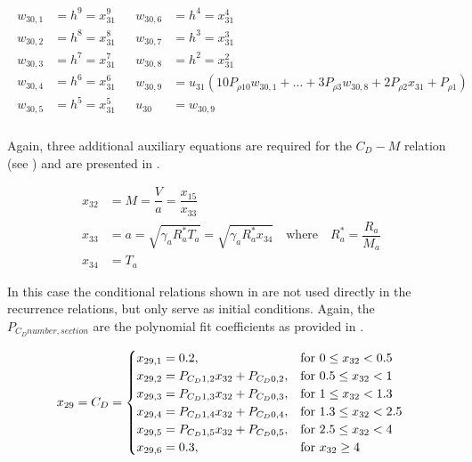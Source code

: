 \begin{align} \label{eq:u30}
\begin{split}
w_{30,1} &= h^{9} = x_{31}^9 \\
w_{30,2} &= h^{8} = x_{31}^8 \\
w_{30,3} &= h^{7} = x_{31}^7 \\
w_{30,4} &= h^{6} = x_{31}^6 \\
w_{30,5} &= h^{5} = x_{31}^5 \\
\end{split}
&
\begin{split}
w_{30,6} &= h^{4} = x_{31}^4 \\
w_{30,7} &= h^{3} = x_{31}^3 \\
w_{30,8} &= h^{2} = x_{31}^2 \\
w_{30,9} &= u_{31}\left(10P_{\rho 10}w_{30,1}+\dots +3P_{\rho 3}w_{30,8} + 2P_{\rho 2}x_{31}+P_{\rho 1}\right) \\
\\
u_{30} &= w_{30,9} \\
\end{split}
\end{align}

Again, three additional auxiliary equations are required for the $C_{D}-M$ relation (see ) and are presented in .

 \begin{equation} \label{eq:cdAux}
\begin{split}
x_{32} &= M = \dfrac{V}{a} = \dfrac{x_{15}}{x_{33}}\\
x_{33} &= a = \sqrt{\gamma_{a}R_{a}^{*}T_{a}} = \sqrt{\gamma_{a}R_{a}^{*}x_{34}} \quad \text{where} \quad R_{a}^{*}=\dfrac{R_{a}}{M_{a}} \\
x_{34} &= T_{a}
\end{split}
\end{equation}

In this case the conditional relations shown in  are not used directly in the recurrence relations, but only serve as initial conditions. Again, the $P_{C_{D} number,section}$ are the polynomial fit coefficients as provided in .

\begin{equation}\label{eq:cdCond}
x_{29}=C_{D}=\begin{cases}
x_{29,1}=0.2, & \text{for } 0\leq x_{32} < 0.5\\
x_{29,2}=P_{C_{D} 1,2}x_{32}+P_{C_{D} 0,2}, &  \text{for } 0.5\leq x_{32} < 1 \\
x_{29,3}=P_{C_{D} 1,3}x_{32}+P_{C_{D} 0,3}, &  \text{for } 1\leq x_{32} < 1.3 \\
x_{29,4}=P_{C_{D} 1,4}x_{32}+P_{C_{D} 0,4}, &  \text{for } 1.3\leq x_{32} < 2.5 \\
x_{29,5}=P_{C_{D} 1,5}x_{32}+P_{C_{D} 0,5}, &  \text{for } 2.5\leq x_{32} < 4 \\
x_{29,6}=0.3, &  \text{for } x_{32} \geq 4 
\end{cases}\\
\end{equation}

